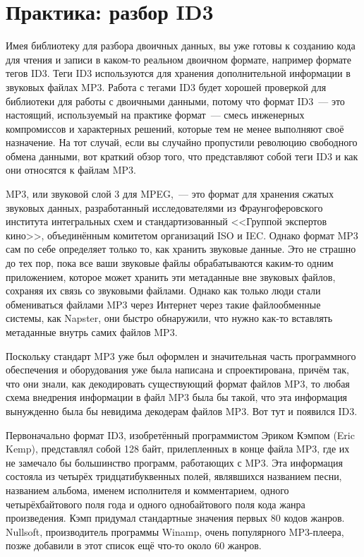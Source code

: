 \chapter{Практика: разбор ID3}
\label{ch:25}

\thispagestyle{empty}

Имея библиотеку для разбора двоичных данных, вы уже готовы к созданию кода для чтения и
записи в каком-то реальном двоичном формате, например формате тегов ID3. Теги ID3
используются для хранения дополнительной информации в звуковых файлах MP3. Работа с тегами
ID3 будет хорошей проверкой для библиотеки для работы с двоичными данными, потому что
формат ID3~--- это настоящий, используемый на практике формат~--- смесь инженерных
компромиссов и характерных решений, которые тем не менее выполняют своё назначение. На
тот случай, если вы случайно пропустили революцию свободного обмена данными, вот краткий
обзор того, что представляют собой теги ID3 и как они относятся к файлам MP3.

MP3, или звуковой слой 3 для MPEG,~--- это формат для хранения
сжатых звуковых данных, разработанный исследователями из Фраунгоферовского института
ин\-тег\-раль\-ных схем и стандартизованный <<Группой экспертов кино>>, объединённым комитетом организаций ISO и IEC. Однако формат MP3 сам по себе определяет только то, как хранить звуковые
данные. Это не страшно до тех пор, пока все ваши звуковые файлы обрабатываются каким-то
одним приложением, которое может хранить эти метаданные вне звуковых файлов, сохраняя их
связь со звуковыми файлами. Однако как только люди стали обмениваться файлами MP3 через
Интернет через такие файлообменные системы, как Napster, они быстро обнаружили, что нужно
как-то вставлять метаданные внутрь самих файлов MP3.

Поскольку стандарт MP3 уже был оформлен и значительная часть программного обеспечения и
оборудования уже была написана и спроектирована, причём так, что они знали, как
декодировать существующий формат файлов MP3, то любая схема внедрения информации в файл
MP3 была бы такой, что эта информация вынужденно была бы невидима декодерам файлов MP3. Вот
тут и появился ID3.

Первоначально формат ID3, изобретённый программистом Эриком Кэмпом (Eric Kemp),
представлял собой 128 байт, прилепленных в конце файла MP3, где их не замечало бы
большинство программ, работающих с MP3. Эта информация состояла из четырёх
тридцатибуквенных полей, являвшихся названием песни, названием альбома, именем исполнителя
и комментарием, одного четырёхбайтового поля года и одного однобайтового поля кода жанра
произведения. Кэмп придумал стандартные значения первых 80 кодов жанров. Nullsoft,
производитель программы Winamp, очень популярного MP3-плеера, позже добавили в этот список
ещё что-то около 60 жанров.

